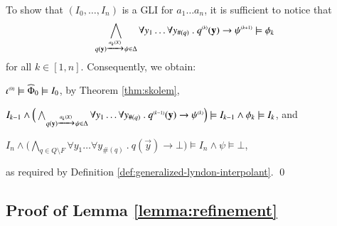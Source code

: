 To show that $(I_0,\ldots,I_n)$ is a GLI for $a_1\ldots a_n$, it is
sufficient to notice that \[\bigwedge_{q(\mathbf y) \xrightarrow{{\scriptscriptstyle a_k(X)}}_{{\scriptstyle }}
  \psi \in \Delta} \forall y_1 \ldots \forall y_{\#(q)} ~.~
{q}^{\scriptscriptstyle{({k})}}(\mathbf y) \rightarrow {\psi}^{\scriptscriptstyle{({k+1})}} \models \phi_k\]
for all $k \in [1,n]$. Consequently, we obtain: \begin{compactitem}
\item ${\iota}^{\scriptscriptstyle{({0})}} \models \widehat{\Phi}_0 \models I_0$, by
  Theorem \ref{thm:skolem},
\item $I_{k-1} \wedge \Big(\bigwedge_{q(\mathbf y) \xrightarrow{{\scriptscriptstyle a_k(X)}}_{{\scriptstyle }}
  \psi \in \Delta} \forall y_1 \ldots \forall y_{\#(q)} ~.~
  {q}^{\scriptscriptstyle{({k-1})}}(\mathbf y) \rightarrow {\psi}^{\scriptscriptstyle{({k})}}\Big) \models
  I_{k-1} \wedge \phi_k \models I_k$, and 
\item $I_n \wedge \Big(\bigwedge_{q \in Q \setminus F} \forall y_1
  \ldots \forall y_{\#(q)} ~.~ q(\vec{y}) \rightarrow \bot\Big)
  \models I_n \wedge \psi \models \bot$,     
\end{compactitem}
as required by Definition
\ref{def:generalized-lyndon-interpolant}. \qed

\subsection{Proof of Lemma \ref{lemma:refinement}}


